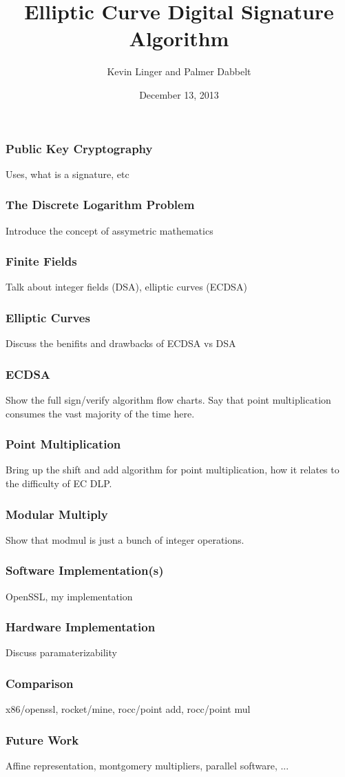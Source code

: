 \documentclass{beamer}
\title{Elliptic Curve Digital Signature Algorithm}
\author{Kevin Linger and Palmer Dabbelt}
\date{December 13, 2013}
\begin{document}
\maketitle

\begin{frame}
  \frametitle{Public Key Cryptography}

  Uses, what is a signature, etc
\end{frame}

\begin{frame}
  \frametitle{The Discrete Logarithm Problem}

  Introduce the concept of assymetric mathematics
\end{frame}

\begin{frame}
  \frametitle{Finite Fields}

  Talk about integer fields (DSA), elliptic curves (ECDSA)
\end{frame}

\begin{frame}
  \frametitle{Elliptic Curves}

  Discuss the benifits and drawbacks of ECDSA vs DSA
\end{frame}

\begin{frame}
  \frametitle{ECDSA}

  Show the full sign/verify algorithm flow charts.  Say that point
  multiplication consumes the vast majority of the time here.
\end{frame}

\begin{frame}
  \frametitle{Point Multiplication}

  Bring up the shift and add algorithm for point multiplication, how
  it relates to the difficulty of EC DLP.
\end{frame}

\begin{frame}
  \frametitle{Modular Multiply}

  Show that modmul is just a bunch of integer operations.
\end{frame}

\begin{frame}
  \frametitle{Software Implementation(s)}

  OpenSSL, my implementation
\end{frame}

\begin{frame}
  \frametitle{Hardware Implementation}

  Discuss paramaterizability
\end{frame}

\begin{frame}
  \frametitle{Comparison}

  x86/openssl, rocket/mine, rocc/point add, rocc/point mul
\end{frame}

\begin{frame}
  \frametitle{Future Work}

  Affine representation, montgomery multipliers, parallel software,
  ...
\end{frame}
\end{document}
